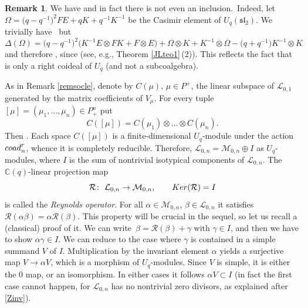 \documentclass[11pt]{article}
\numberwithin{equation}{section}
\numberwithin{equation}{section}
\theoremstyle{definition}
\newtheorem{Remark}[teo]{Remark}
\newcommand{\mc}{\mathbb{C}}
\newcommand{\Ll}{{\mathcal L}}
\newcommand{\Mm}{{\mathcal M}}
\newcommand{\Rr}{{\mathcal R}}
\newcommand{\ra}{\rightarrow}
\begin{document}
\begin{Remark}We have  and in fact there is not even an inclusion.~Indeed, let $\Omega=\big(q-q^{-1}\big)^2FE+qK+q^{-1}K^{-1}$ be the Casimir element of $U_q({\mathfrak{sl}_2})$. We trivially have~ but
\[\Delta(\Omega)=\big(q-q^{-1}\big)^2\big(K^{-1}E\otimes FK+F\otimes E\big)+
\Omega\otimes K+ K^{-1}\otimes \Omega-\big(q+q^{-1}\big)K^{-1}\otimes K\]
and therefore , since  (see, e.g., Theorem \ref{JLteo1}\,(2)). This reflects the fact that  is only a right coideal of $U_q$ (and not a subcoalgebra).
\end{Remark}
As in Remark \ref{remsocle}, denote by $C(\mu)$, $\mu\in P^+$, the linear subspace of $\Ll_{0,1}$ generated by the matrix coefficients of $V_\mu$. For every tuple $[\mu] = (\mu_1,\dots,\mu_n)\in P_+^n$ put
\begin{equation}\label{defCmu}
C([\mu]) =C(\mu_1)\otimes \dots \otimes C(\mu_n).
\end{equation}
Then . Each space $C({[\mu]})$ is a finite-dimensional $U_q$-module under the action ${\rm coad}^r_n$, whence it is completely reducible. Therefore, $
\Ll_{0,n} = \Mm_{0,n} \oplus I$ as $U_q$-modules, where $I$ is the sum of nontrivial isotypical components of $\Ll_{0,n}$. The $\mc(q)$-linear projection map
\begin{equation}\label{Reynoldsdef}
\Rr\colon\ {\mathcal L}_{0,n}\ra \Mm_{0,n}, \qquad {\rm Ker}(\Rr)=I
\end{equation}
is called the {\it Reynolds operator}. For all $\alpha\in \Mm_{0,n}$, $\beta \in \Ll_{0,n}$ it satisfies $
\Rr(\alpha \beta) = \alpha \Rr(\beta)$.
This property will be crucial in the sequel, so let us recall a (classical) proof of it. We can write~${\beta = \Rr(\beta) + \gamma}$ with $\gamma \in I$, and then we have to show $\alpha \gamma \in I$. We can reduce to the case where $\gamma$ is contained in a simple summand $V$ of $I$. Multiplication by the invariant element $\alpha$ yields a surjective map $V \ra \alpha V$, which is a morphism of $U_q$-modules. Since $V$ is simple, it is either the $0$ map, or an isomorphism. In either cases it follows $\alpha V \subset I$ (in fact the first case cannot happen, for $\Ll_{0,n}$ has no nontrivial zero divisors, as explained after \eqref{Zinv}).
\end{document}
